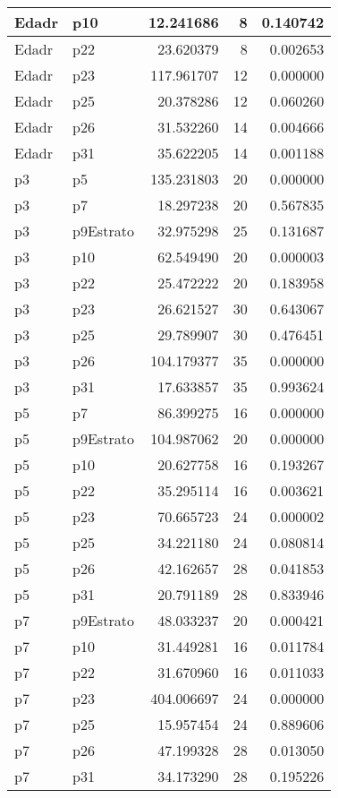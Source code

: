 \begin{table}
\begin{tabular}[t]{l|l|r|r|r}
\hline
Edadr & p10 & 12.241686 & 8 & 0.140742\\
\hline
Edadr & p22 & 23.620379 & 8 & 0.002653\\
\hline
Edadr & p23 & 117.961707 & 12 & 0.000000\\
\hline
Edadr & p25 & 20.378286 & 12 & 0.060260\\
\hline
Edadr & p26 & 31.532260 & 14 & 0.004666\\
\hline
Edadr & p31 & 35.622205 & 14 & 0.001188\\
\hline
p3 & p5 & 135.231803 & 20 & 0.000000\\
\hline
p3 & p7 & 18.297238 & 20 & 0.567835\\
\hline
p3 & p9Estrato & 32.975298 & 25 & 0.131687\\
\hline
p3 & p10 & 62.549490 & 20 & 0.000003\\
\hline
p3 & p22 & 25.472222 & 20 & 0.183958\\
\hline
p3 & p23 & 26.621527 & 30 & 0.643067\\
\hline
p3 & p25 & 29.789907 & 30 & 0.476451\\
\hline
p3 & p26 & 104.179377 & 35 & 0.000000\\
\hline
p3 & p31 & 17.633857 & 35 & 0.993624\\
\hline
p5 & p7 & 86.399275 & 16 & 0.000000\\
\hline
p5 & p9Estrato & 104.987062 & 20 & 0.000000\\
\hline
p5 & p10 & 20.627758 & 16 & 0.193267\\
\hline
p5 & p22 & 35.295114 & 16 & 0.003621\\
\hline
p5 & p23 & 70.665723 & 24 & 0.000002\\
\hline
p5 & p25 & 34.221180 & 24 & 0.080814\\
\hline
p5 & p26 & 42.162657 & 28 & 0.041853\\
\hline
p5 & p31 & 20.791189 & 28 & 0.833946\\
\hline
p7 & p9Estrato & 48.033237 & 20 & 0.000421\\
\hline
p7 & p10 & 31.449281 & 16 & 0.011784\\
\hline
p7 & p22 & 31.670960 & 16 & 0.011033\\
\hline
p7 & p23 & 404.006697 & 24 & 0.000000\\
\hline
p7 & p25 & 15.957454 & 24 & 0.889606\\
\hline
p7 & p26 & 47.199328 & 28 & 0.013050\\
\hline
p7 & p31 & 34.173290 & 28 & 0.195226\\

\end{tabular}
\end{table}
